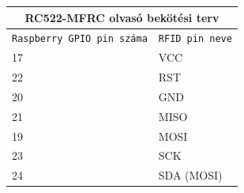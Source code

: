 \documentclass[11pt, a4paper]{article}
\begin{document}
			\begin{minipage}{\linewidth}
				\fontsize{10}{16}\selectfont
				\centering
				\begin{tabular}{||m{6em} m{6em}||}
					\hline
					\multicolumn{2}{|c|}{\textbf{RC522-MFRC olvasó bekötési terv}} \\
					\hline
					\texttt{Raspberry GPIO pin száma} & \texttt{RFID pin neve} \\
					\hline\hline
					17 & VCC \\ 
					\hline
					22 & RST \\ 
					\hline
					20 & GND \\ 
					\hline
					21 & MISO \\
					\hline
					19 & MOSI \\
					\hline
					23 & SCK \\
					\hline
					24 & SDA (MOSI) \\
					\hline
				\end{tabular}
				\label{table:rfidconnections}
			\end{minipage}
			
\end{document}
